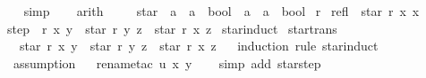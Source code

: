 \begin{isabellebody}
\ \ \isamarkupfalse%
{\isacharparenleft}{\kern0pt}simp{\isacharparenright}{\kern0pt}\isanewline
\ \ \isamarkupfalse%
\ arith\isanewline
\ \ \isamarkupfalse%
%
\endisatagproof
{\isafoldproof}%
%
\isadelimproof
%
\endisadelimproof
%
\isadelimdocument
%
\endisadelimdocument
%
\isatagdocument
%
\isamarkuptrue%
%
\endisatagdocument
{\isafolddocument}%
%
\isadelimdocument
%
\endisadelimdocument
{}\isamarkupfalse%
\isanewline
\ \ star\ {\isacharcolon}{\kern0pt}{\isacharcolon}{\kern0pt}\ {\isachardoublequoteopen}{\isacharparenleft}{\kern0pt}{\isacharprime}{\kern0pt}a\ {\isasymRightarrow}\ {\isacharprime}{\kern0pt}a\ {\isasymRightarrow}\ bool{\isacharparenright}{\kern0pt}\ {\isasymRightarrow}\ {\isacharprime}{\kern0pt}a\ {\isasymRightarrow}\ {\isacharprime}{\kern0pt}a\ {\isasymRightarrow}\ bool{\isachardoublequoteclose}\isanewline
{}\ r\ \isanewline
refl{\isacharcolon}{\kern0pt}\ \ {\isachardoublequoteopen}star\ r\ x\ x{\isachardoublequoteclose}\ {\isacharbar}{\kern0pt}\isanewline
step{\isacharcolon}{\kern0pt}\ \ {\isachardoublequoteopen}r\ x\ y\ {\isasymLongrightarrow}\ star\ r\ y\ z\ {\isasymLongrightarrow}\ star\ r\ x\ z{\isachardoublequoteclose}\isanewline
\isanewline
{}\isamarkupfalse%
\isanewline
{}\isamarkupfalse%
\ star{\isachardot}{\kern0pt}induct\isanewline
\isanewline
{}\isamarkupfalse%
\ star{\isacharunderscore}{\kern0pt}trans{\isacharcolon}{\kern0pt}\isanewline
\ \ {\isachardoublequoteopen}star\ r\ x\ y\ {\isasymLongrightarrow}\ star\ r\ y\ z\ {\isasymLongrightarrow}\ star\ r\ x\ z{\isachardoublequoteclose}\isanewline
%
\isadelimproof
\ \ %
\endisadelimproof
%
\isatagproof
{}\isamarkupfalse%
{\isacharparenleft}{\kern0pt}induction\ rule{\isacharcolon}{\kern0pt}\ star{\isachardot}{\kern0pt}induct{\isacharparenright}{\kern0pt}\isanewline
\ \ \isamarkupfalse%
\ assumption\isanewline
\ \ \isamarkupfalse%
{\isacharparenleft}{\kern0pt}rename{\isacharunderscore}{\kern0pt}tac\ u\ x\ y{\isacharparenright}{\kern0pt}\isanewline
\ \ \isamarkupfalse%
\ {\isacharparenleft}{\kern0pt}simp\ add{\isacharcolon}{\kern0pt}\ star{\isachardot}{\kern0pt}step{\isacharparenright}{\kern0pt}%
\endisatagproof
{\isafoldproof}%
%
\isadelimproof
\isanewline
%
\endisadelimproof
%
\isadelimtheory
\isanewline
%
\endisadelimtheory
%
\isatagtheory
{}\isamarkupfalse%
%
\endisatagtheory
{\isafoldtheory}%
%
\isadelimtheory
%
\endisadelimtheory
%
\end{isabellebody}%
